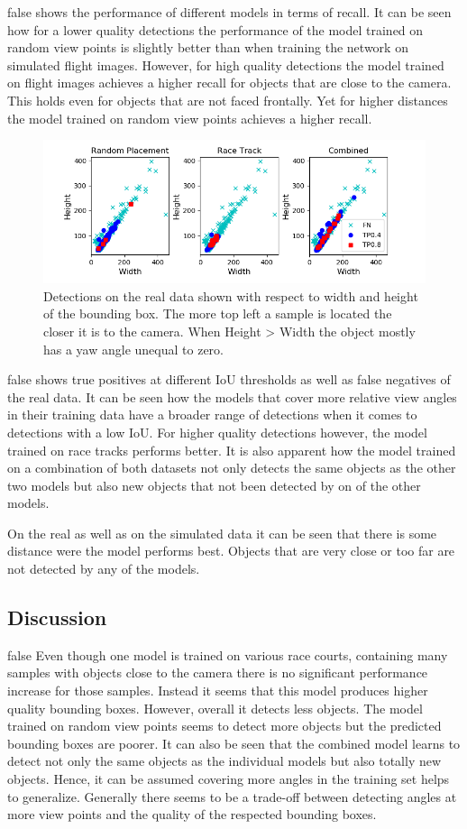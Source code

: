 \if false
 shows the performance of different models in terms of recall. It can be seen how for a lower quality detections the performance of the model trained on random view points is slightly better than when training the network on simulated flight images. However, for high quality detections the model trained on flight images achieves a higher recall for objects that are close to the camera. This holds even for objects that are not faced frontally. Yet for higher distances the model trained on random view points achieves a higher recall. 
\fi 
\begin{figure}[htbp]
	\centering
	\includegraphics[width=\textwidth]{fig/view_scatter}
	\caption{Detections on the real data shown with respect to width and height of the bounding box. The more top left a sample is located the closer it is to the camera. When Height > Width the object mostly has a yaw angle unequal to zero.}
	\label{fig:view_scatter}
\end{figure}
\if false
 shows true positives at different \ac{IoU} thresholds as well as false negatives of the real data. It can be seen how the models that cover more relative view angles in their training data have a broader range of detections when it comes to detections with a low \ac{IoU}. For higher quality detections however, the model trained on race tracks performs better. It is also apparent how the model trained on a combination of both datasets not only detects the same objects as the other two models but also new objects that not been detected by on of the other models.

On the real as well as on the simulated data it can be seen that there is some distance were the model performs best. Objects that are very close or too far are not detected by any of the models.
\fi
\subsection{Discussion}
\if false
Even though one model is trained on various race courts, containing many samples with objects close to the camera there is no significant performance increase for those samples. Instead it seems that this model produces higher quality bounding boxes. However, overall it detects less objects. The model trained on random view points seems to detect more objects but the predicted bounding boxes are poorer. It can also be seen that the combined model learns to detect not only the same objects as the individual models but also totally new objects. Hence, it can be assumed covering more angles in the training set helps to generalize. Generally there seems to be a trade-off between detecting angles at more view points and the quality of the respected bounding boxes.


